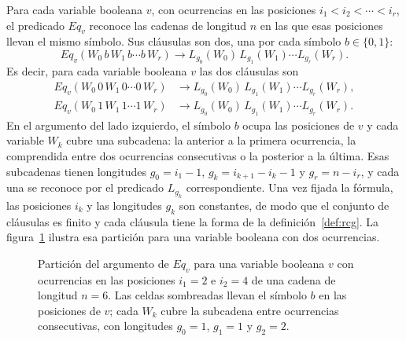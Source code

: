 \documentclass{report}
\theoremstyle{definition}
\theoremstyle{plain}
\begin{document}
Para cada variable booleana $v$, con ocurrencias en las posiciones
$i_1 < i_2 < \cdots < i_r$, el predicado $Eq_v$ reconoce las cadenas de
longitud $n$ en las que esas posiciones llevan el mismo símbolo. Sus
cláusulas son dos, una por cada símbolo $b \in \{0,1\}$:
\[
  Eq_v(W_0\, b\, W_1\, b \cdots b\, W_r) \to
  L_{g_0}(W_0)\, L_{g_1}(W_1) \cdots L_{g_r}(W_r).
\]
Es decir, para cada variable booleana $v$ las dos cláusulas son
\[
\begin{aligned}
  Eq_v(W_0\, 0\, W_1\, 0 \cdots 0\, W_r) &\to
    L_{g_0}(W_0)\, L_{g_1}(W_1) \cdots L_{g_r}(W_r), \\
  Eq_v(W_0\, 1\, W_1\, 1 \cdots 1\, W_r) &\to
    L_{g_0}(W_0)\, L_{g_1}(W_1) \cdots L_{g_r}(W_r).
\end{aligned}
\]
En el argumento del lado izquierdo, el símbolo $b$ ocupa las posiciones de
$v$ y cada variable $W_k$ cubre una subcadena: la anterior a la primera
ocurrencia, la comprendida entre dos ocurrencias consecutivas o la
posterior a la última. Esas subcadenas tienen longitudes
$g_0 = i_1 - 1$, $g_k = i_{k+1} - i_k - 1$ y $g_r = n - i_r$, y cada
una se reconoce por el predicado $L_{g_k}$ correspondiente. Una vez
fijada la fórmula, las posiciones $i_k$ y las longitudes $g_k$ son
constantes, de modo que el conjunto de cláusulas es finito y cada
cláusula tiene la forma de la definición~\ref{def:rcg}. La
figura~\ref{fig:particion-eqv} ilustra esa partición para una variable
booleana con dos ocurrencias.

\begin{figure}[ht]
\centering
{}
\caption[Partición del argumento de $Eq_v$]{Partición del argumento de $Eq_v$ para una variable booleana
$v$ con ocurrencias en las posiciones $i_1=2$ e $i_2=4$ de una cadena de
longitud $n=6$. Las celdas sombreadas llevan el símbolo $b$ en las
posiciones de $v$; cada $W_k$ cubre la subcadena entre ocurrencias
consecutivas, con longitudes $g_0=1$, $g_1=1$ y $g_2=2$.}
\label{fig:particion-eqv}
\end{figure}
\end{document}
